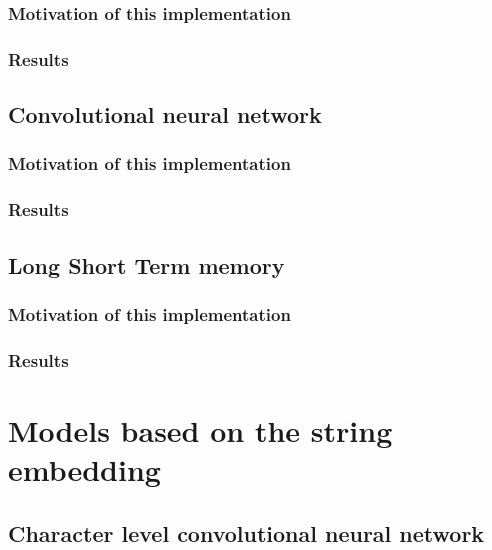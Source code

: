\documentclass{article}
\begin{document}
    \subsubsection{Motivation of this implementation}

    \subsubsection{Results}

    \subsection{Convolutional neural network}\label{subsec:convolutional-neural-network}

    \subsubsection{Motivation of this implementation}

    \subsubsection{Results}

    \subsection{Long Short Term memory}\label{subsec:long-short-term-memory}

    \subsubsection{Motivation of this implementation}

    \subsubsection{Results}


    \section{Models based on the string embedding}\label{sec:models-based-on-the-string-embedding}

    \subsection{Character level convolutional neural network}\label{subsec:character-level-convolutional-neural-network}
\end{document}
